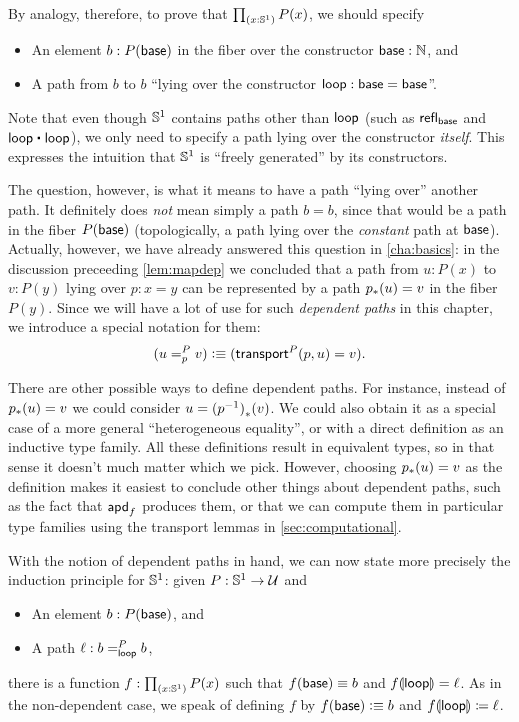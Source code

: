 By analogy, therefore, to prove that $\prd{x:\Sn^1} P(x)$, we should specify
\begin{itemize}
\item An element $b:P(\base)$ in the fiber over the constructor $\base:\nat$, and
\item A path from $b$ to $b$ ``lying over the constructor $\lloop:\base=\base$''.
\end{itemize}
Note that even though $\Sn^1$ contains paths other than $\lloop$ (such as $\refl{\base}$ and $\lloop\ct\lloop$), we only need to specify a path lying over the constructor \emph{itself}.
This expresses the intuition that $\Sn^1$ is ``freely generated'' by its constructors.

The question, however, is what it means to have a path ``lying over'' another path.
It definitely does \emph{not} mean simply a path $b=b$, since that would be a path in the fiber $P(\base)$ (topologically, a path lying over the \emph{constant} path at $\base$).
Actually, however, we have already answered this question in \autoref{cha:basics}: in the discussion preceeding \autoref{lem:mapdep} we concluded that a path from $u:P(x)$ to $v:P(y)$ lying over $p:x=y$ can be represented by a path $\trans p u = v$ in the fiber $P(y)$.
Since we will have a lot of use for such \emph{dependent paths} in this chapter, we introduce a special notation for them:
\[ (\dpath P p u v) \defeq (\transfib{P} p u = v). \]

\begin{rmk}
There are other possible ways to define dependent paths.
For instance, instead of $\trans p u = v$ we could consider $u = \trans{(\opp p)}{v}$.
We could also obtain it as a special case of a more general ``heterogeneous equality'', or with a direct definition as an inductive type family.
All these definitions result in equivalent types, so in that sense it doesn't much matter which we pick.
However, choosing $\trans p u = v$ as the definition makes it easiest to conclude other things about dependent paths, such as the fact that $\apdfunc{f}$ produces them, or that we can compute them in particular type families using the transport lemmas in \autoref{sec:computational}.
\end{rmk}

With the notion of dependent paths in hand, we can now state more precisely the induction principle for $\Sn^1$: given $P:\Sn^1\to\type$ and
\begin{itemize}
\item An element $b:P(\base)$, and
\item A path $\ell : \dpath P \lloop b b$,
\end{itemize}
there is a function $f:\prd{x:\Sn^1} P(x)$ such that $f(\base)\jdeq b$ and $\apd f \lloop = \ell$.
As in the non-dependent case, we speak of defining $f$ by $f(\base)\defeq b$ and $\apd f \lloop \defid \ell$.


